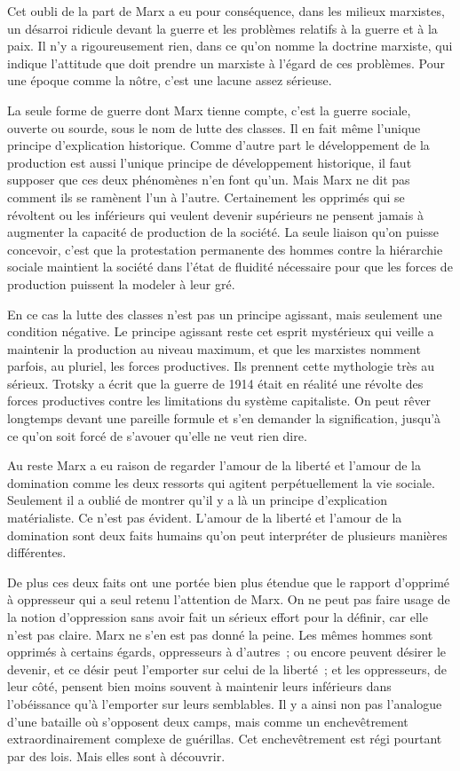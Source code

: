 \documentclass[french,twoside]{book} %
\begin{document}
Cet oubli de la part de Marx a eu pour conséquence, dans les milieux marxistes, un désarroi ridicule devant la guerre et les problèmes relatifs à la guerre et à la paix. Il n'y a rigoureusement rien, dans ce qu'on nomme la doctrine marxiste, qui indique l'attitude que doit prendre un marxiste à l'égard de ces problèmes. Pour une époque comme la nôtre, c'est une lacune assez sérieuse.\par
La seule forme de guerre dont Marx tienne compte, c'est la guerre sociale, ouverte ou sourde, sous le nom de lutte des classes. Il en fait même l'unique principe d'explication historique. Comme d'autre part le développement de la production est aussi l'unique principe de développement historique, il faut supposer que ces deux phénomènes n'en font qu'un. Mais Marx ne dit pas comment ils se ramènent l'un à l'autre. Certainement les opprimés qui se révoltent ou les inférieurs qui veulent devenir supérieurs ne pensent jamais à augmenter la capacité de production de la société. La seule liaison qu'on puisse concevoir, c'est que la protestation permanente des hommes contre la hiérarchie sociale maintient la société dans l'état de fluidité nécessaire pour que les forces de production puissent la modeler à leur gré.\par
En ce cas la lutte des classes n'est pas un principe agissant, mais seulement une condition négative. Le principe agissant reste cet esprit mystérieux qui veille a maintenir la production au niveau maximum, et que les marxistes nomment parfois, au pluriel, les forces productives. Ils prennent cette mythologie très au sérieux. Trotsky a écrit que la guerre de 1914 était en réalité une révolte des forces productives contre les limitations du système capitaliste. On peut rêver longtemps devant une pareille formule et s'en demander la signification, jusqu'à ce qu'on soit forcé de s'avouer qu'elle ne veut rien dire.\par
Au reste Marx a eu raison de regarder l'amour de la liberté et l'amour de la domination comme les deux ressorts qui agitent perpétuellement la vie sociale. Seulement il a oublié de montrer qu'il y a là un principe d'explication matérialiste. Ce n'est pas évident. L'amour de la liberté et l'amour de la domination sont deux faits humains qu'on peut interpréter de plusieurs manières différentes.\par
De plus ces deux faits ont une portée bien plus étendue que le rapport d'opprimé à oppresseur qui a seul retenu l'attention de Marx. On ne peut pas faire usage de la notion d'oppression sans avoir fait un sérieux effort pour la définir, car elle n'est pas claire. Marx ne s'en est pas donné la peine. Les mêmes hommes sont opprimés à certains égards, oppresseurs à d'autres ; ou encore peuvent désirer le devenir, et ce désir peut l'emporter sur celui de la liberté ; et les oppresseurs, de leur côté, pensent bien moins souvent à maintenir leurs inférieurs dans l'obéissance qu'à l'emporter sur leurs semblables. Il y a ainsi non pas l'analogue d'une bataille où s'opposent deux camps, mais comme un enchevêtrement extraordinairement complexe de guérillas. Cet enchevêtrement est régi pourtant par des lois. Mais elles sont à découvrir.\par
\end{document}
